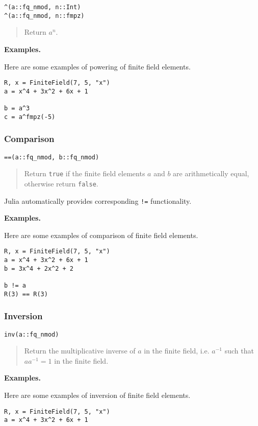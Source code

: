 \documentclass[a4paper,10pt]{article}
\newcommand{\code}{\lstinline}
\newcommand{\desc}[1]{\vspace{-3mm}\begin{quote}#1\end{quote}}
\begin{document}
{{\begin{lstlisting}
^(a::fq_nmod, n::Int)
^(a::fq_nmod, n::fmpz)
\end{lstlisting}

\desc{Return $a^n$.}

\textbf{Examples.}

Here are some examples of powering of finite field elements.

\begin{lstlisting}
R, x = FiniteField(7, 5, "x")
a = x^4 + 3x^2 + 6x + 1

b = a^3
c = a^fmpz(-5)
\end{lstlisting}

\subsubsection{Comparison}

\begin{lstlisting}
==(a::fq_nmod, b::fq_nmod)
\end{lstlisting}

\desc{Return \code{true} if the finite field elements $a$ and $b$ are 
arithmetically equal, otherwise return \code{false}.}

Julia automatically provides corresponding \code{!=} functionality.

\textbf{Examples.}

Here are some examples of comparison of finite field elements.

\begin{lstlisting}
R, x = FiniteField(7, 5, "x")
a = x^4 + 3x^2 + 6x + 1
b = 3x^4 + 2x^2 + 2

b != a
R(3) == R(3)
\end{lstlisting}

\subsubsection{Inversion}

\begin{lstlisting}
inv(a::fq_nmod)
\end{lstlisting}

\desc{Return the multiplicative inverse of $a$ in the finite field, i.e. 
$a^{-1}$ such that $aa^{-1} = 1$ in the finite field.}

\textbf{Examples.}

Here are some examples of inversion of finite field elements.

\begin{lstlisting}
R, x = FiniteField(7, 5, "x")
a = x^4 + 3x^2 + 6x + 1


\end{lstlisting}}}
\end{document}
